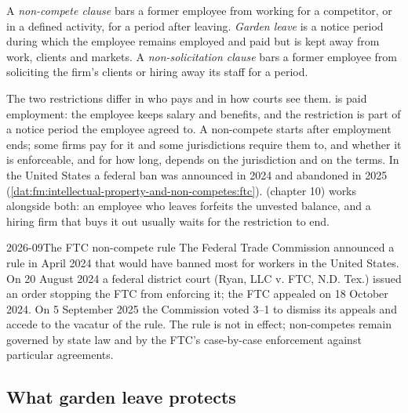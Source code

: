\begin{definition}\label{def:fm:intellectual-property-and-non-competes:restrict}
A \emph{non-compete clause} bars a former employee from working for a competitor, or in a defined activity, for a period
after leaving. \emph{Garden leave} is a notice period during which the employee remains employed and paid but is kept away
from work, clients and markets. A \emph{non-solicitation clause} bars a former employee from soliciting the firm's
clients or hiring away its staff for a period.
\end{definition}

The two restrictions differ in who pays and in how courts see them.  is paid employment: the employee keeps salary and benefits, and
the restriction is part of a notice period the employee agreed to. A non-compete starts after employment ends; some firms pay for it and some
jurisdictions require them to, and whether it is enforceable, and for how long, depends on the jurisdiction and on the terms. In the United States
a federal ban was announced in 2024 and abandoned in 2025 (\cref{dat:fm:intellectual-property-and-non-competes:ftc}). 
(chapter 10) works alongside both: an employee who leaves forfeits the unvested balance, and a hiring firm that buys it out usually waits for the
restriction to end.

\begin{dated}{2026-09}{The FTC non-compete rule}\label{dat:fm:intellectual-property-and-non-competes:ftc}
The Federal Trade Commission announced a rule in April 2024 that would have banned most  for workers in the United States. On
20 August 2024 a federal district court (Ryan, LLC v. FTC, N.D. Tex.) issued an order stopping the FTC from enforcing it; the FTC appealed on 18
October 2024. On 5 September 2025 the Commission voted 3--1 to dismiss its appeals and accede to the vacatur of the rule. The rule is not in
effect; non-competes remain governed by state law and by the FTC's case-by-case enforcement against particular agreements.
\end{dated}

\subsection{What garden leave protects}

